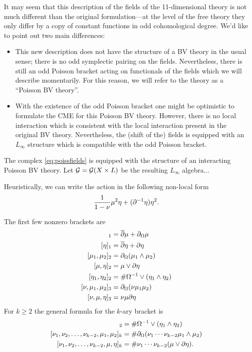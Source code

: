 \documentclass[11pt]{amsart}
\begin{document}
It may seem that this description of the fields of the 11-dimensional theory is not much different than the original formulation---at the level of the free theory they only differ by a copy of constant functions in odd cohomological degree. 
We'd like to point out two main differences:
\begin{itemize}
\item This new description does not have the structure of a BV theory in the usual sense; there is no odd symplectic pairing on the fields. 
Nevertheless, there is still an odd Poisson bracket acting on functionals of the fields which we will describe momentarily. 
For this reason, we will refer to the theory as a ``Poisson BV theory''. 
\item With the existence of the odd Poisson bracket one might be optimistic to formulate the CME for this Poisson BV theory.
However, there is no local interaction which is consistent with the local interaction present in the original BV theory. 
Nevertheless, the (shift of the) fields is equipped with an $L_\infty$ structure which is compatible with the odd Poisson bracket. 
\end{itemize}

\begin{prop}
The complex \eqref{eq:poissfields} is equipped with the structure of an interacting Poisson BV theory.
Let $\mathcal G = \mathcal G(X \times L)$ be the resulting $L_\infty$ algebra...
\end{prop}

Heuristically, we can write the action in the following non-local form
\[
\frac{1}{1-\nu} \mu^2 \eta + (\partial^{-1} \eta) \eta^2 .
\]

The first few nonzero brackets are
\begin{align*}
[\mu]_1 & = \dbar \mu + \div \mu \\
[\eta]_1 & = \dbar \eta + \del \eta \\ 
[\mu_1,\mu_2]_2 & = \div (\mu_1 \wedge \mu_2) \\
[\mu, \eta]_2 & = \mu \vee \del \eta \\
[\eta_1,\eta_2]_2 & = \# \Omega^{-1} \vee (\eta_1 \wedge \eta_2)  \\
[\nu, \mu_1,\mu_2]_3 & = \div(\nu \mu_1 \mu_2) \\
[\nu, \mu,\eta]_3 & = \nu \mu \del \eta
\end{align*}
For $k \geq 2$ the general formula for the $k$-ary bracket is 
\begin{align*}
[\eta_1,\eta_2]_2 & = \# \Omega^{-1} \vee (\eta_1 \wedge \eta_2)  \\
[\nu_1,\nu_2, \ldots, \nu_{k-2}, \mu_1,\mu_2]_{k} & = \# \div(\nu_1 \cdots \nu_{k-2} \mu_1 \wedge \mu_2) \\ 
[\nu_1,\nu_2, \ldots, \nu_{k-2}, \mu,\eta]_{k} & = \# \nu_1 \cdots \nu_{k-2} (\mu \vee \del \eta) .
\end{align*}
\end{document}
